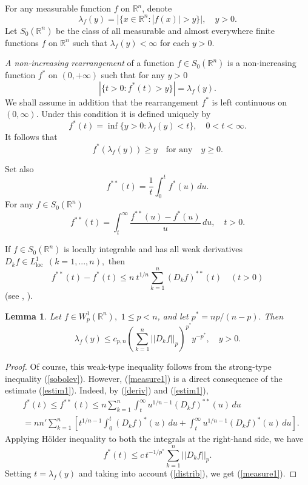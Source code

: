 \documentclass[12pt,twoside,reqno]{amsart}
\numberwithin{equation}{section}
\newtheorem{lem}[teo]{Lemma}
\theoremstyle{definition}
\numberwithin{equation}{section}
\begin{document}
For any measurable function  $f$ on $\mathbb{R}^n$, denote
$$
\lambda_f (y) = |\{x \in \mathbb{R}^n : |f(x)|>y \}|, \quad y>0.
$$
Let $S_0(\mathbb{R}^n)$ be the class of all measurable and almost
everywhere finite functions $f$ on $\mathbb{R}^n$ such that
$\lambda_f (y)< \infty$  for each $y>0$.

{\it A non-increasing rearrangement} of a function $f \in
S_0(\mathbb{R}^n)$ is a non-increasing function $f^*$ on $(0, +
\infty)$ such that for any $y>0$
$$
|\{t>0: f^*(t)>y\}|= \lambda_f (y).
$$
We shall assume in addition that the rearrangement $f^*$ is left
continuous on $(0,\infty).$ Under this condition it is defined
uniquely by
$$
f^*(t)=\inf\{y>0: \lambda_f (y)<t\}, \quad 0<t<\infty.
$$
It follows that
\begin{equation}\label{distrib}
f^*({\lambda }_f(y))\ge y \quad\mbox{for any} \quad y\ge 0.
\end{equation}

Set also
$$
f^{**}(t)=\frac1t\int_0^t f^*(u)\,du.
$$
For any $f\in S_0({\mathbb{R}}^n)$
\begin{equation}\label{deriv}
f^{**}(t)=\int_t^\infty \frac{f^{**}(u)-f^*(u)}{u}\,du,\quad t>0.
\end{equation}

If $f\in S_0({\mathbb{R}}^n)$ is locally integrable and has all weak
derivatives $D_k f \in L^1_{\operatorname{loc}}~~(k=1,...,n),$
then
\begin{equation}\label{estim1}
f^{**}(t) - f^*(t)\le n~t^{1/n}\sum_{k=1}^n(D_k f)^{**}(t) \quad (t>0)
\end{equation}
(see \cite[Lemma 5.1]{K1989}, \cite[Lemma 3.1]{K2007}).

\begin{lem}\label{MEASURE1} Let $f\in W_p^1({\mathbb{R}}^n),\,\, 1\le p<n$,
and let $p^*=np/(n-p).$ Then
\begin{equation}\label{measure1}
\lambda_f(y)\le c_{p,n}\left(\sum_{k=1}^n||D_k f||_p\right)^{p^*}y^{-p^*}, \quad y>0.
\end{equation}
\end{lem}
\begin{proof}
Of course, this weak-type inequality follows from the strong-type
inequality (\ref{sobolev}). However, (\ref{measure1}) is a direct
consequence of the estimate (\ref{estim1}). Indeed, by (\ref{deriv})
and (\ref{estim1}),
$$
\begin{aligned}
&f^*(t) \le f^{**}(t)\le n\sum_{k=1}^n\int_t^\infty
u^{1/n-1}(D_k f)^{**}(u)\,du\\
&=nn'\sum_{k=1}^n\left[t^{1/n-1}\int_0^t (D_k f)^*(u)\,du + \int_t^\infty
u^{1/n-1}(D_k f)^*(u)\,du\right].
\end{aligned}
$$
 Applying H\"older inequality to  both the
integrals at the right-hand side, we have
$$
f^*(t)\le c\, t^{-1/p^*} \sum_{k=1}^n||D_k f||_p.
$$
Setting $t={\lambda }_f(y)$ and taking into account (\ref{distrib}), we get
(\ref{measure1}).
\end{proof}
\end{document}
